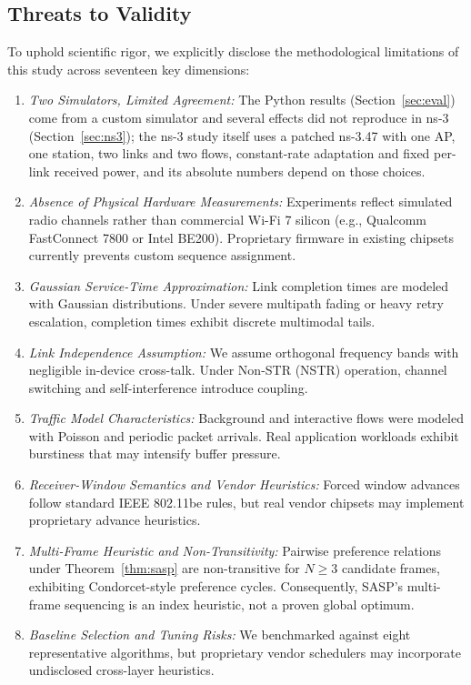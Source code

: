 \documentclass[10pt,journal,compsoc]{IEEEtran}
\begin{document}
\subsection{Threats to Validity}
To uphold scientific rigor, we explicitly disclose the methodological limitations of this study across seventeen key dimensions:
\begin{enumerate}
    \item \emph{Two Simulators, Limited Agreement:} The Python results (Section~\ref{sec:eval}) come from a custom simulator and several effects did not reproduce in ns-3 (Section~\ref{sec:ns3}); the ns-3 study itself uses a patched ns-3.47 with one AP, one station, two links and two flows, constant-rate adaptation and fixed per-link received power, and its absolute numbers depend on those choices.
    \item \emph{Absence of Physical Hardware Measurements:} Experiments reflect simulated radio channels rather than commercial Wi-Fi 7 silicon (e.g., Qualcomm FastConnect 7800 or Intel BE200). Proprietary firmware in existing chipsets currently prevents custom sequence assignment.
    \item \emph{Gaussian Service-Time Approximation:} Link completion times are modeled with Gaussian distributions. Under severe multipath fading or heavy retry escalation, completion times exhibit discrete multimodal tails.
    \item \emph{Link Independence Assumption:} We assume orthogonal frequency bands with negligible in-device cross-talk. Under Non-STR (NSTR) operation, channel switching and self-interference introduce coupling.
    \item \emph{Traffic Model Characteristics:} Background and interactive flows were modeled with Poisson and periodic packet arrivals. Real application workloads exhibit burstiness that may intensify buffer pressure.
    \item \emph{Receiver-Window Semantics and Vendor Heuristics:} Forced window advances follow standard IEEE 802.11be rules, but real vendor chipsets may implement proprietary advance heuristics.
    \item \emph{Multi-Frame Heuristic and Non-Transitivity:} Pairwise preference relations under Theorem~\ref{thm:sasp} are non-transitive for $N \ge 3$ candidate frames, exhibiting Condorcet-style preference cycles. Consequently, SASP's multi-frame sequencing is an index heuristic, not a proven global optimum.
    \item \emph{Baseline Selection and Tuning Risks:} We benchmarked against eight representative algorithms, but proprietary vendor schedulers may incorporate undisclosed cross-layer heuristics.

\end{enumerate}
\end{document}
